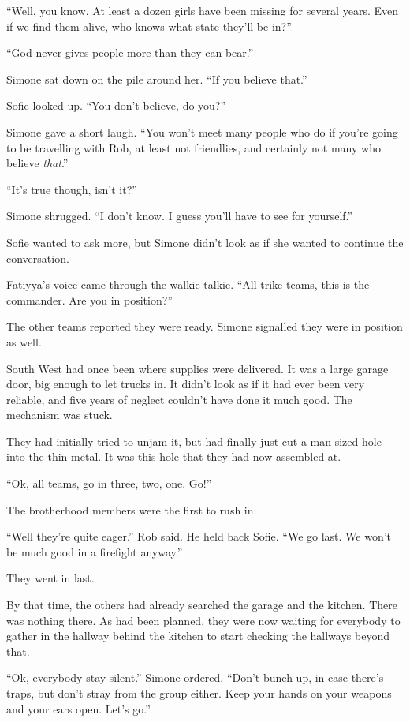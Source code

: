 \documentclass[letterpaper,12pt]{report}
\begin{document}
``Well, you know. At least a dozen girls have been missing for several years. Even if we find them alive, who knows what state they'll be in?''

``God never gives people more than they can bear.''

Simone sat down on the pile around her. ``If you believe that.''

Sofie looked up. ``You don't believe, do you?''

Simone gave a short laugh. ``You won't meet many people who do if you're going to be travelling with Rob, at least not friendlies, and certainly not many who believe \textit{that}.''

``It's true though, isn't it?''

Simone shrugged. ``I don't know. I guess you'll have to see for yourself.''

Sofie wanted to ask more, but Simone didn't look as if she wanted to continue the conversation.
\act

Fatiyya's voice came through the walkie-talkie. ``All trike teams, this is the commander. Are you in position?''

The other teams reported they were ready. Simone signalled they were in position as well.

South West had once been where supplies were delivered. It was a large garage door, big enough to let trucks in. It didn't look as if it had ever been very reliable, and five years of neglect couldn't have done it much good. The mechanism was stuck.

They had initially tried to unjam it, but had finally just cut a man-sized hole into the thin metal. It was this hole that they had now assembled at.

``Ok, all teams, go in three, two, one. Go!''

The brotherhood members were the first to rush in.

``Well they're quite eager.'' Rob said. He held back Sofie. ``We go last. We won't be much good in a firefight anyway.''

They went in last.

By that time, the others had already searched the garage and the kitchen. There was nothing there. As had been planned, they were now waiting for everybody to gather in the hallway behind the kitchen to start checking the hallways beyond that.

``Ok, everybody stay silent.'' Simone ordered. ``Don't bunch up, in case there's traps, but don't stray from the group either. Keep your hands on your weapons and your ears open. Let's go.''
\end{document}
